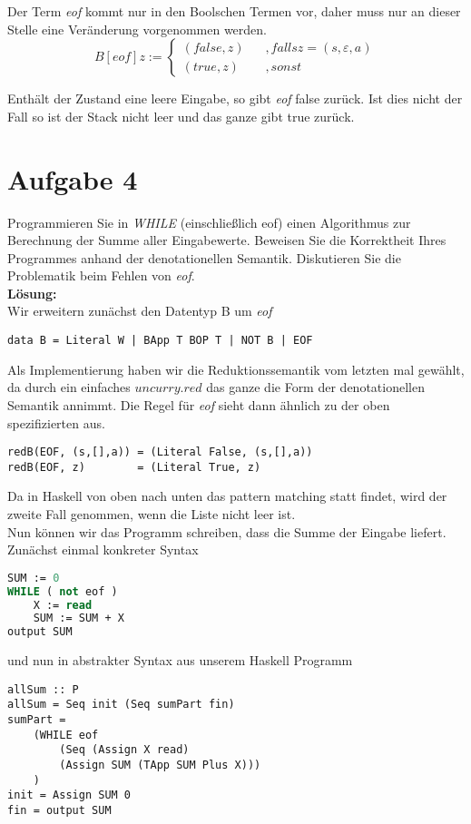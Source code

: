 \documentclass[11pt,a4paper,ngerman]{article}
\begin{document}
Der Term \emph{eof} kommt nur in den Boolschen Termen vor, daher muss nur an dieser 
Stelle eine Veränderung vorgenommen werden.\\

$$
B[eof]z :=
\left\{\begin{array}{lr}
(false,z) \;\;\;&,falls z=(s,\varepsilon,a)\\
(true,z) &, sonst
\end{array}\right.
$$

Enthält der Zustand eine leere Eingabe, so gibt \emph{eof} false zurück.
Ist dies nicht der Fall so ist der Stack nicht leer und das ganze gibt true zurück.


\section*{Aufgabe 4}


Programmieren Sie in \emph{WHILE} (einschließlich eof) einen Algorithmus
zur Berechnung der Summe aller Eingabewerte. Beweisen Sie die Korrektheit
Ihres Programmes anhand der denotationellen Semantik. Diskutieren Sie die
Problematik beim Fehlen von \emph{eof}.\\

\textbf{Lösung:}\\

Wir erweitern zunächst den Datentyp B um \emph{eof}
\begin{lstlisting}
data B = Literal W | BApp T BOP T | NOT B | EOF
\end{lstlisting}
Als Implementierung haben wir die Reduktionssemantik vom letzten
mal gewählt, da durch ein einfaches $uncurry.red$ das ganze die Form
der denotationellen Semantik annimmt. Die Regel für \emph{eof} sieht dann
ähnlich zu der oben spezifizierten aus.
\begin{lstlisting}
redB(EOF, (s,[],a)) = (Literal False, (s,[],a))
redB(EOF, z)        = (Literal True, z)
\end{lstlisting}
Da in Haskell von oben nach unten das pattern matching statt findet, wird
der zweite Fall genommen, wenn die Liste nicht leer ist.\\

Nun können wir das Programm schreiben, dass die Summe der Eingabe liefert.
Zunächst einmal konkreter Syntax
\begin{lstlisting}[language=Pascal]
SUM := 0
WHILE ( not eof )
    X := read
    SUM := SUM + X
output SUM
\end{lstlisting}
und nun in abstrakter Syntax aus unserem Haskell Programm
\begin{lstlisting}
allSum :: P
allSum = Seq init (Seq sumPart fin)
sumPart = 
    (WHILE eof
        (Seq (Assign X read)
        (Assign SUM (TApp SUM Plus X)))
    )
init = Assign SUM 0
fin = output SUM
\end{lstlisting}
\end{document}
